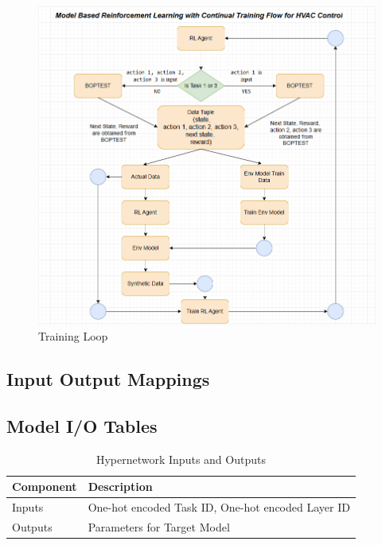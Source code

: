 \documentclass{article}
\begin{document}
\begin{figure}[H]
  \centering
  \includegraphics[width=\linewidth, height=0.7\textheight, keepaspectratio]{FlowCharts/Training_Loop.png}
  \caption{Training Loop}
  \label{fig:trainingloop}
\end{figure}

\vspace{-1em}  %



\FloatBarrier  %



\subsection{Input Output Mappings}

\subsection*{Model I/O Tables}

\begin{table}[H]
\centering
\caption{Hypernetwork Inputs and Outputs}
\label{tab:hypernet-io}
\begin{tabular}{|l|p{10cm}|}
\hline
\textbf{Component} & \textbf{Description} \\
\hline
Inputs & One-hot encoded Task ID, One-hot encoded Layer ID \\
Outputs & Parameters for Target Model \\
\hline
\end{tabular}
\end{table}
\end{document}

